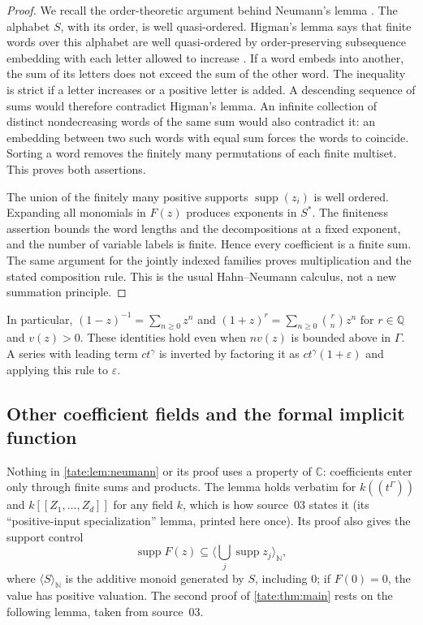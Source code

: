 \documentclass[11pt,letterpaper]{article}
\theoremstyle{definition}
\newcommand{\C}{\mathbb C}
\newcommand{\Q}{\mathbb Q}
\newcommand{\N}{\mathbb N}
\newcommand{\supp}{\operatorname{supp}}
\newcommand{\SpanM}[1]{\langle #1\rangle_{\N}}
\begin{document}
\begin{proof}
We recall the order-theoretic argument behind Neumann's lemma
\cite{Neumann}. The alphabet $S$, with its order, is well quasi-ordered.
Higman's lemma says that finite words over this alphabet are well
quasi-ordered by order-preserving subsequence embedding with each letter
allowed to increase \cite{Higman}. If a word embeds into another, the
sum of its letters does not exceed the sum of the other word. The
inequality is strict if a letter increases or a positive letter is added.
A descending sequence of sums would therefore contradict Higman's lemma.
An infinite collection of distinct nondecreasing words of the same sum
would also contradict it: an embedding between two such words with equal
sum forces the words to coincide. Sorting a word removes the finitely
many permutations of each finite multiset. This proves both assertions.

The union of the finitely many positive supports $\supp(z_i)$ is well
ordered. Expanding all monomials in $F(z)$ produces exponents in $S^*$.
The finiteness assertion bounds the word lengths and the decompositions
at a fixed exponent, and the number of variable labels is finite.
Hence every coefficient is a finite sum. The same argument for the
jointly indexed families proves multiplication and the stated composition
rule. This is the usual Hahn--Neumann calculus, not a new summation
principle.
\end{proof}

In particular, $(1-z)^{-1}=\sum_{n\ge0}z^n$ and
$(1+z)^r=\sum_{n\ge0}\binom rn z^n$ for $r\in\Q$ and $v(z)>0$.
These identities hold even when $n v(z)$ is bounded above in $\Gamma$.
A series with leading term $ct^\gamma$ is inverted by factoring it as
$ct^\gamma(1+\varepsilon)$ and applying this rule to $\varepsilon$.

\subsection{Other coefficient fields and the formal implicit function}

Nothing in \cref{tate:lem:neumann} or its proof uses a property of $\C$:
coefficients enter only through finite sums and products. The lemma holds
verbatim for $k((t^\Gamma))$ and $k[[Z_1,\dots,Z_d]]$ for any field $k$,
which is how source~03 states it (its ``positive-input specialization''
lemma, printed here once). Its proof also gives the support control
\begin{equation}
 \supp F(z)\subseteq\SpanM{\textstyle\bigcup_j\supp z_j},
 \label{tate:node:eq:support-control}
\end{equation}
where $\SpanM S$ is the additive monoid generated by $S$, including $0$;
if $F(0)=0$, the value has positive valuation. The second proof of
\cref{tate:thm:main} rests on the following lemma, taken from source~03.
\end{document}
